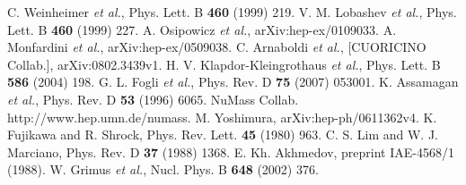 \begin{thebibliography}{99}
C. Weinheimer \textit{et al.}, Phys. Lett. B \textbf{460} (1999) 219.
V. M. Lobashev \textit{et al.}, Phys. Lett. B \textbf{460} (1999) 227.
A. Osipowicz \textit{et al.}, arXiv:hep-ex/0109033.
A. Monfardini \textit{et al.}, arXiv:hep-ex/0509038.
C. Arnaboldi \textit{et al.}, [CUORICINO Collab.], arXiv:0802.3439v1.
H. V. Klapdor-Kleingrothaus \textit{et al.}, Phys. Lett. B \textbf{586} (2004) 198.
G. L. Fogli \textit{et al.}, Phys. Rev. D \textbf{75} (2007) 053001.
K. Assamagan \textit{et al.}, Phys. Rev. D \textbf{53} (1996) 6065.
NuMass Collab. http://www.hep.umn.de/numass.
 M. Yoshimura, arXiv:hep-ph/0611362v4.
 K. Fujikawa and R. Shrock, Phys. Rev. Lett. \textbf{45} (1980) 963.
C. S. Lim and W. J. Marciano, Phys. Rev. D \textbf{37} (1988) 1368.
E. Kh. Akhmedov, preprint IAE-4568/1 (1988).
W. Grimus \textit{et al.}, Nucl. Phys. B \textbf{648} (2002) 376.


\end{thebibliography}
